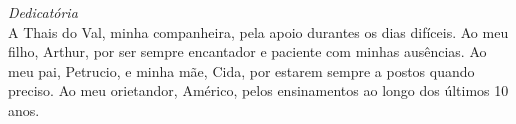 \clearpage

\vspace*{0.75\textheight}

\begin{flushright}
\emph{Dedicatória} \\

  A Thais do Val, minha companheira, pela apoio durantes os dias difíceis.
  Ao meu filho, Arthur, por ser sempre encantador e paciente com minhas ausências. 
	Ao meu pai, Petrucio, e minha mãe, Cida, por estarem sempre a postos quando preciso. 
	Ao meu orietandor, Américo, pelos ensinamentos ao longo dos últimos 10 anos. 
\end{flushright}
